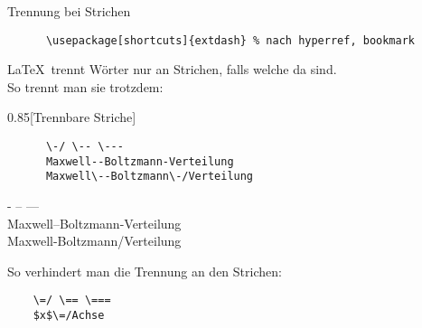 \begin{frame}[fragile]{
  Trennung bei Strichen \hfill
}
  \begin{Packages}
    \begin{lstlisting}
      \usepackage[shortcuts]{extdash} % nach hyperref, bookmark
    \end{lstlisting}
  \end{Packages}

  \LaTeX\ trennt Wörter nur an Strichen, falls welche da sind.\\
  So trennt man sie trotzdem:
  \vspace{-0.5em}
  \begin{CodeExample}{0.85}[Trennbare Striche]
    \begin{lstlisting}
      \-/ \-- \---
      Maxwell--Boltzmann-Verteilung
      Maxwell\--Boltzmann\-/Verteilung
    \end{lstlisting}
  \CodeResult
    - -- --- \\
    Maxwell--Boltzmann-Verteilung \\
    Maxwell\--Boltzmann\-/Verteilung
  \end{CodeExample}

  \vspace{-7em}
  So verhindert man die Trennung an den Strichen:
  \begin{lstlisting}
    \=/ \== \===
    $x$\=/Achse
  \end{lstlisting}
\end{frame}
